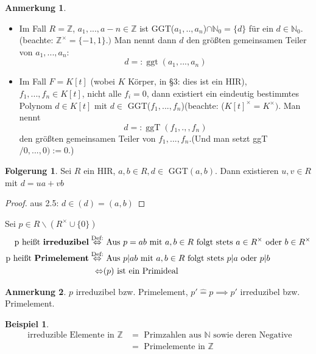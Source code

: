 \documentclass[a4paper, titlepage]{article}
\theoremstyle{definition}
\newtheorem{bsp}[satz]{Beispiel}
\newtheorem*{anm}{Anmerkung}
\newtheorem*{fg}{Folgerung}
\newcommand{\N}{\mathbb{N}}
\newcommand{\Z}{\mathbb{Z}}
\begin{document}
\begin{anm}
    \begin{itemize}
    \item Im Fall $R=\Z$, $a_1,...,a-n\in\Z$ ist GGT($a_1,..,a_n$)$\cap \N_{0}=\{d\}$ für ein $d\in \N_{0}.$ (beachte: $\Z^{\times}=\{-1,1\}.)$ Man nennt dann $d$ den größten gemeinsamen Teiler von $a_1,...,a_n$: $$d=:\operatorname{ggt}(a_1,...,a_n)$$
    \item Im Fall $F=K[t]$ (wobei $K$ Körper, in §3: dies ist ein HIR), $f_1,...,f_n\in K[t]$, nicht alle $f_i=0$, dann existiert ein eindeutig bestimmtes Polynom $d\in K[t]$ mit $d\in$ GGT($f_1,...,f_n$)(beachte: ($K[t]^{\times}=K^{\times})$. Man nennt $$d=: \operatorname{ggT}(f_1,.,,f_n)$$ den größten gemeinsamen Teiler von $f_1,...,f_n$.(Und man setzt ggT$/0,...,0):=0$.)
    \end{itemize}
\end{anm}
\begin{fg}
    Sei $R$ ein HIR, $a,b\in R, d\in$ GGT$(a,b)$. Dann existieren $u,v\in R$ mit $d=ua+vb$
\end{fg}
\begin{proof}
    aus 2.5: $d\in(d)=(a,b)$
\end{proof}
\begin{definition}
    Sei $p\in R\backslash(R^{\times}\cup \{0\})$
    \begin{align*}
        \text{p heißt \textbf{irreduzibel}}\overset{\text{Def:}}{\Leftrightarrow}& \text{ Aus } p=ab \text{ mit } a,b\in R \text{ folgt stets }a\in R^{\times} \text{ oder } b\in R^{\times}\\
        \text{p heißt \textbf{Primelement}}\overset{\text{Def:}}{\Leftrightarrow}& \text{ Aus } p|ab \text{ mit } a,b\in R \text{ folgt stets } p|a \text{ oder } p|b\\
        \Leftrightarrow& (p) \text{ ist ein Primideal}
    \end{align*}
\end{definition}
\begin{anm}
    $p$ irreduzibel bzw. Primelement, $p'\widehat= p\implies p'$ irreduzibel bzw. Primelement.
\end{anm}
\begin{bsp}
    \begin{align*}
        \text{ irreduzible Elemente in }\Z &= \text{ Primzahlen aus }\N \text{ sowie deren Negative}\\
        &= \text{ Primelemente in }\Z
    \end{align*}
\end{bsp}
\end{document}
